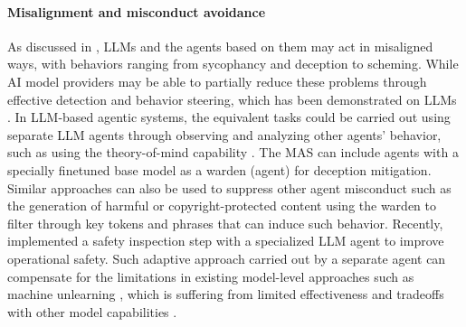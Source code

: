 \documentclass[11pt]{article}
\begin{document}


\paragraph{Misalignment and misconduct avoidance} As discussed in , LLMs and the agents based on them may act in misaligned ways, with behaviors ranging from sycophancy and deception to scheming. While AI model providers may be able to partially reduce these problems through effective detection and behavior steering, which has been demonstrated on LLMs \citep{rimsky_steering_2024,gdill_detecting_2025,williams_targeted_2025}. In LLM-based agentic systems, the equivalent tasks could be carried out using separate LLM agents through observing and analyzing other agents' behavior, such as using the theory-of-mind capability \citep{street_llm_2024}. The MAS can include agents with a specially finetuned base model \citep{binz_turning_2023} as a warden (agent) for deception mitigation. Similar approaches can also be used to suppress other agent misconduct such as the generation of harmful or copyright-protected content using the warden to filter through key tokens and phrases that can induce such behavior. Recently, \citet{hua_trustagent_2024} implemented a safety inspection step with a specialized LLM agent to improve operational safety. Such adaptive approach carried out by a separate agent can compensate for the limitations in existing model-level approaches such as machine unlearning \citep{bourtoule2021machine}, which is suffering from limited effectiveness and tradeoffs with other model capabilities \citep{cooper_machine_2024,liu_rethinking_2025}.

\end{document}
